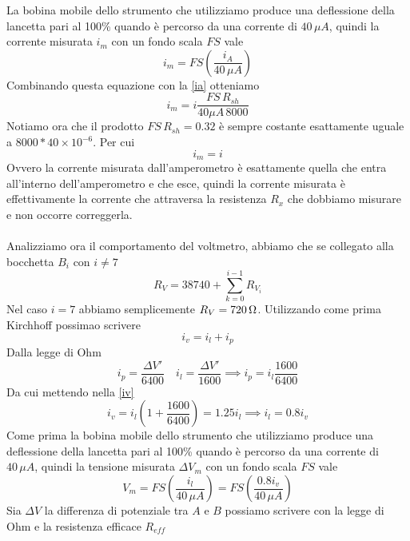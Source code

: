 \documentclass[12pt]{article}
\begin{document}
La bobina mobile dello strumento che utilizziamo produce una deflessione della lancetta pari al 100\% quando è percorso da una corrente di $40\,\mu A$, quindi la corrente misurata $i_m$ con un fondo scala $FS$ vale
\begin{equation}
i_m = FS\left(\frac{i_A}{40\,\mu A}\right)
\end{equation}
Combinando questa equazione con la \eqref{ia} otteniamo
\begin{equation}
i_m = i\frac{FS\,R_{sh}}{40\mu A\,8000}
\end{equation}
Notiamo ora che il prodotto $FS\,R_{sh} = 0.32$ è sempre costante esattamente uguale a $8000*40\times 10^{-6}$. Per cui
\begin{equation}
i_m = i
\end{equation}
Ovvero la corrente misurata dall'amperometro è esattamente quella che entra all'interno dell'amperometro e che esce, quindi la corrente misurata è effettivamente la corrente che attraversa la resistenza $R_x$ che dobbiamo misurare e non occorre correggerla.\\
\\Analizziamo ora il comportamento del voltmetro, abbiamo che se collegato alla bocchetta $B_i$ con $i\neq 7$
\begin{equation}
R_V = 38740 + \sum_{k=0}^{i-1}R_{V_i}
\end{equation}
Nel caso $i=7$ abbiamo semplicemente $R_V = 720\,\ohm$. Utilizzando come prima Kirchhoff possimao scrivere
\begin{equation}
\label{iv}
i_v = i_l+i_p
\end{equation}
Dalla legge di Ohm
\begin{equation}
i_p = \frac{\Delta V'}{6400}\quad i_l = \frac{\Delta V'}{1600} \implies i_p = i_l\frac{1600}{6400}
\end{equation}
Da cui mettendo nella \eqref{iv}
\begin{equation}
i_v = i_l \left(1 + \frac{1600}{6400}\right) = 1.25i_l \implies i_l=0.8i_v
\end{equation}
Come prima la bobina mobile dello strumento che utilizziamo produce una deflessione della lancetta pari al 100\% quando è percorso da una corrente di $40\,\mu A$, quindi la tensione misurata $\Delta V_m$ con un fondo scala $FS$ vale
\begin{equation}
\label{vm}
V_m = FS\left(\frac{i_l}{40\,\mu A}\right) = FS\left(\frac{0.8i_v}{40\,\mu A}\right)
\end{equation}
Sia $\Delta V$ la differenza di potenziale tra $A$ e $B$ possiamo scrivere con la legge di Ohm e la resistenza efficace $R_{eff}$
\end{document}

